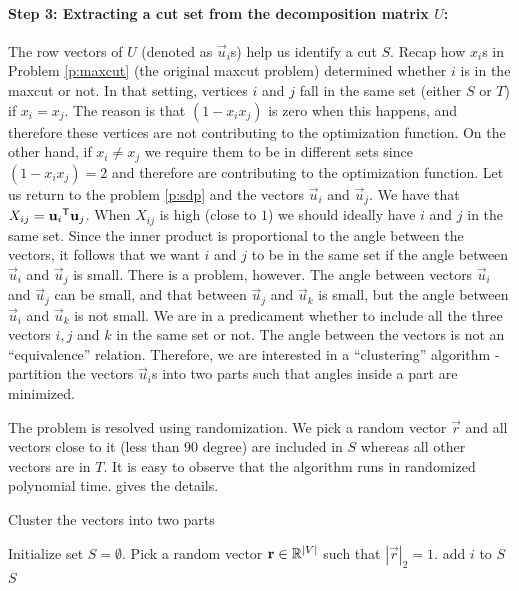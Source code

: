 \documentclass[12pt,
    driverfallback=dvipdfm,
 	openany,
    a4paper,
    toc=bibliography,
    twoside,
    numbers=noenddot]{article}              %
\begin{document}
\paragraph*{Step 3: Extracting a cut set from the decomposition matrix $U$:}
The row vectors of $U$ (denoted as $\vec u_i$s) help us identify a cut $S$. Recap how $x_i$s in Problem \ref{p:maxcut} (the original maxcut problem) determined whether $i$ is in the maxcut or not. In that setting, vertices $i$ and $j$ fall in the same set (either $S$ or $T$) if $x_i=x_j$. The reason is that $(1-x_ix_j)$ is zero when this happens, and therefore these vertices are not contributing to the optimization function. On the other hand, if $x_i \neq x_j$ we require them to be in different sets since $(1-x_ix_j) =2$ and therefore are contributing to the optimization function. Let us return to the problem \ref{p:sdp} and the vectors $\vec u_i$ and $\vec u_j$. We have that $X_{ij} = {\mathbf u_i}^{\mathsf{T}} \mathbf u_j$. When $X_{ij}$ is high (close to $1$) we should ideally have $i$ and $j$ in the same set. Since the inner product is proportional to the angle between the vectors, it follows that we want $i$ and $j$ to be in the same set if the angle between $\vec u_i$ and $\vec u_j$ is small. There is a problem, however. The angle between vectors $\vec u_i$ and $\vec u_j$ can be small, and that between $\vec u_j$ and $\vec u_k$ is small, but the angle between $\vec u_i$ and $\vec u_k$ is not small. We are in a predicament whether to include all the three vectors $i, j$ and $k$ in the same set or not. The angle between the vectors is not an ``equivalence'' relation. Therefore, we are interested in a ``clustering'' algorithm - partition the vectors $\vec u_i$s into two parts such that angles inside a part are minimized. 

The problem is resolved using randomization. We pick a random vector $\vec r$ and all vectors close to it (less than $90$ degree) are included in $S$ whereas all other vectors are in $T$. 
It is easy to observe that the algorithm runs in randomized polynomial time.  gives the details.  
\begin{algorithm}[h!]
\caption{Cluster the vectors into two parts}
\label{alg:cluster}
\begin{algorithmic}
\STATE Initialize set $S = \emptyset$.
\STATE Pick a random vector $\mathbf r \in \mathbb{R}^{|V|}$ such that $|\vec r|_2 = 1$.	 
		\STATE add $i$ to $S$
	\ENDIF
	\STATE {}
\ENDFOR
\RETURN $S$
\end{algorithmic}
\end{algorithm}
\end{document}
